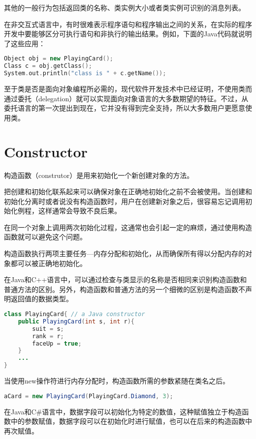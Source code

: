 其他的一般行为包括返回类的名称、类实例大小或者类实例可识别的消息列表。

在非交互式语言中，有时很难表示程序语句和程序输出之间的关系，在实际的程序开发中要能够区分可执行语句和非执行的输出结果。例如，下面的Java代码就说明了这些应用：




\begin{lstlisting}[language=C++]
Object obj = new PlayingCard();
Class c = obj.getClass();
System.out.println("class is " + c.getName());
\end{lstlisting}

至于类是否是面向对象编程所必需的，现代软件开发技术中已经证明，不使用类而通过委托（delegation）就可以实现面向对象语言的大多数期望的特征。不过，从委托语言的第一次提出到现在，它并没有得到完全支持，所以大多数用户更愿意使用类。


\chapter{Constructor}

构造函数（construtor）是用来初始化一个新创建对象的方法。

把创建和初始化联系起来可以确保对象在正确地初始化之前不会被使用。当创建和初始化分离时或者说没有构造函数时，用户在创建新对象之后，很容易忘记调用初始化例程，这样通常会导致不良后果。

在同一个对象上调用两次初始化过程，这通常也会引起一定的麻烦，通过使用构造函数就可以避免这个问题。

构造函数执行两项主要任务—内存分配和初始化，从而确保所有得以分配内存的对象都可以被正确地初始化。

在Java和C++语言中，可以通过检查与类显示的名称是否相同来识别构造函数和普通方法的区别。另外，构造函数和普通方法的另一个细微的区别是构造函数不声明返回值的数据类型。

\begin{lstlisting}[language=Java]
class PlayingCard{ // a Java constructor
	public PlayingCard(int s, int r){
		suit = s;
		rank = r;
		faceUp = true;
	}
	...
}
\end{lstlisting}


当使用new操作符进行内存分配时，构造函数所需的参数紧随在类名之后。


\begin{lstlisting}[language=Java]
aCard = new PlayingCard(PlayingCard.Diamond, 3);
\end{lstlisting}

在Java和C\#语言中，数据字段可以初始化为特定的数值，这种赋值独立于构造函数中的参数赋值，数据字段可以在初始化时进行赋值，也可以在后来的构造函数中再次赋值。



